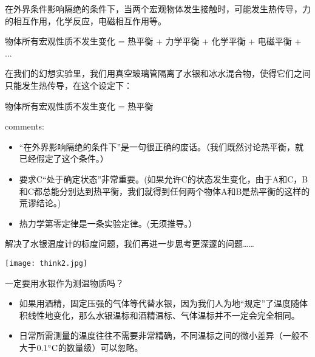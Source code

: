 \documentclass[CJK]{beamer}
\begin{document}
\begin{frame}
\bch
在外界条件影响隔绝的条件下，当两个宏观物体发生接触时，可能发生热传导，力的相互作用，化学反应，电磁相互作用等。

\skipline

物体所有宏观性质不发生变化 = 热平衡 + 力学平衡 + 化学平衡 + 电磁平衡 + ... 

\skiplines

在我们的幻想实验里，我们用真空玻璃管隔离了水银和冰水混合物，使得它们之间只能发生热传导，在这个设定下：

\skipline

物体所有宏观性质不发生变化 = 热平衡

\ech
\end{frame}

\begin{frame}
\bch
{\large {}}

\skiplines

comments:
\begin{itemize}
\item{“在外界影响隔绝的条件下”是一句很正确的废话。{\small（我们既然讨论热平衡，就已经假定了这个条件。）}}
\item{要求C“处于确定状态”非常重要。{\small (如果允许C的状态发生变化，由于A和C，B和C都总能分别达到热平衡，我们就得到任何两个物体A和B是热平衡的这样的荒谬结论。)}}
\item{热力学第零定律是一条实验定律。{\small (无须推导。）}}
\end{itemize}
\ech
\end{frame}

\begin{frame}
\bch
解决了水银温度计的标度问题，我们再进一步思考更深邃的问题……
\begin{center}
\texttt{[image: think2.jpg]}
\end{center}
\ech
\end{frame}

\begin{frame}
\bch
一定要用水银作为测温物质吗？

\skiplines

\begin{itemize}
\item{如果用酒精，固定压强的气体等代替水银，因为我们人为地“规定”了温度随体积线性地变化，那么水银温标和酒精温标、气体温标并不一定会完全相同。}
\item{日常所需测量的温度往往不需要非常精确，不同温标之间的微小差异（一般不大于$0.1^\circ \mathrm{C}$的数量级）可以忽略。}
\end{itemize}

\ech
\end{frame}
\end{document}
